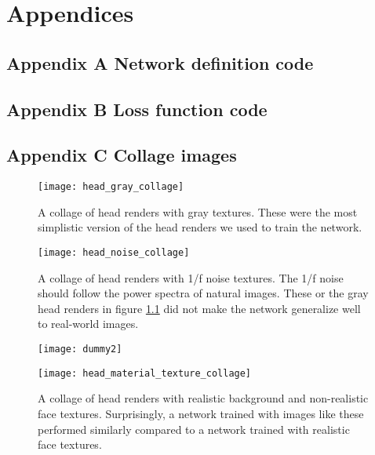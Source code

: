 \chapter{Appendices}
\section{Appendix A Network definition code}
\label{appendix:network_code}



\cleardoublepage
\section{Appendix B Loss function code}
\label{appendix:loss_code}



\cleardoublepage

\section{Appendix C Collage images}

\begin{figure}[b!]
    \texttt{[image: head\_gray\_collage]}
    \caption[Gray head render collage]{A collage of head renders with gray textures. These were the most simplistic version of the head renders we used to train the network.}
    \label{fig:head_gray_collage_1}
\end{figure}

\begin{figure}
    \texttt{[image: head\_noise\_collage]}
    \caption[Noise head render collage]{A collage of head renders with 1/f noise textures. The 1/f noise should follow the power spectra of natural images. These or the gray head renders in figure \ref{fig:head_gray_collage_1} did not make the network generalize well to real-world images.}
    \label{fig:head_noise_collage_1}
\end{figure}

\begin{figure}
    \texttt{[image: dummy2]}
    \caption*{}
\end{figure}

\begin{figure}
    \texttt{[image: head\_material\_texture\_collage]}
    \caption[Non-realistic head render collage]{A collage of head renders with realistic background and non-realistic face textures. Surprisingly, a network trained with images like these performed similarly compared to a network trained with realistic face textures.}
    \label{fig:head_material_texture_collage_1}
\end{figure}

